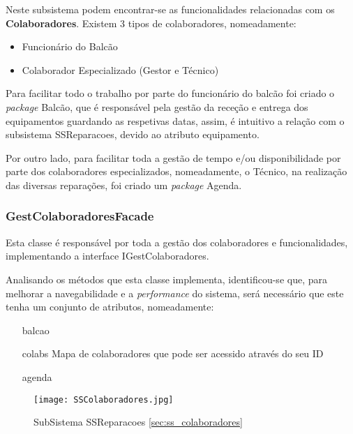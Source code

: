\documentclass[../../relatorio.tex]{subfiles}
\begin{document}
Neste subsistema podem encontrar-se as funcionalidades relacionadas com os \textbf{Colaboradores}.
Existem 3 tipos de colaboradores, nomeadamente:
\begin{itemize}
    \item Funcionário do Balcão
    \item Colaborador Especializado (Gestor e Técnico)
\end{itemize}

Para facilitar todo o trabalho por parte do funcionário do balcão foi criado o \textit{package} Balcão, que é responsável pela gestão da
receção e entrega dos equipamentos guardando as respetivas datas, assim, é intuitivo a relação com o subsistema SSReparacoes, devido ao atributo equipamento.

Por outro lado, para facilitar toda a gestão de tempo e/ou disponibilidade por parte dos colaboradores especializados, nomeadamente, o Técnico, na realização das 
diversas reparações, foi criado um \textit{package} Agenda. 

\subsubsection{GestColaboradoresFacade}
Esta classe é responsável por toda a gestão dos colaboradores e funcionalidades, implementando a interface IGestColaboradores.

Analisando os métodos que esta classe implementa, identificou-se que, para melhorar a navegabilidade
e a \textit{performance} do sistema, será necessário que este tenha um conjunto de atributos, nomeadamente:
\begin{itemize}
    \item [balcao]
    \item [colabs]{Mapa de colaboradores que pode ser acessido através do seu ID}
    \item [agenda]
\end{itemize}

\begin{figure}[!ht]
    \centering
    \texttt{[image: SSColaboradores.jpg]}
    \caption{SubSistema SSReparacoes \ref{sec:ss_colaboradores}}
\end{figure}
\end{document}
